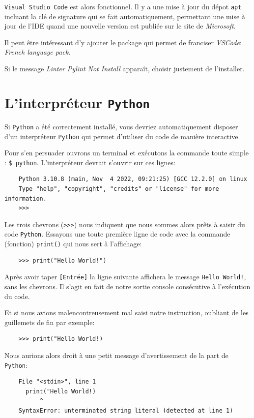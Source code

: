 \documentclass[a4paper,11pt]{book}
\begin{document}
\texttt{Visual Studio Code} est alors fonctionnel. Il y a une mise à jour du dépot \texttt{apt} incluant la clé de signature qui se fait automatiquement, permettant une mise à jour de l'IDE  quand une nouvelle version est publiée sur le site de \textit{Microsoft}.
\medskip

Il peut être intéressant d'y ajouter le package qui permet de franciser \textit{VSCode}: \textit{French language pack}.
\medskip

Si le message \textit{Linter Pylint Not Install} apparaît, choisir justement de l'installer.
\medskip

\section{L'interpréteur \texttt{Python}}
Si \texttt{Python} a été correctement installé, vous devriez automatiquement disposer d'un interpréteur \texttt{Python} qui permet d'utiliser du code de manière interactive.
\medskip

Pour s'en persuader ouvrons un terminal et exécutons la commande toute simple : \verb|$ python|. L'interpréteur devrait s'ouvrir sur ces lignes:
\begin{verbatim}
    Python 3.10.8 (main, Nov  4 2022, 09:21:25) [GCC 12.2.0] on linux
    Type "help", "copyright", "credits" or "license" for more information.
    >>> 
\end{verbatim}
\medskip

Les trois chevrons (\verb|>>>|) nous indiquent que nous sommes alors prêts à saisir du code \texttt{Python}. Essayons une toute première ligne de code avec la commande (fonction) \texttt{print()} qui nous sert à l'affichage:
\begin{verbatim}
    >>> print("Hello World!")
\end{verbatim}
\medskip

Après avoir taper \texttt{[Entrée]} la ligne suivante affichera le message \texttt{Hello World!}, sans les chevrons. Il s'agit en fait de notre sortie console consécutive à l'exécution du code.
\medskip

Et si nous avions malencontreusement mal saisi notre instruction, oubliant de les guillemets de fin par exemple:
\begin{verbatim}
    >>> print("Hello World!)
\end{verbatim}
\medskip

Nous aurions alors droit à une petit message d'avertissement de la part de \texttt{Python}:
\begin{verbatim}
    File "<stdin>", line 1
      print("Hello World!)
          ^
    SyntaxError: unterminated string literal (detected at line 1)
\end{verbatim}
\end{document}
